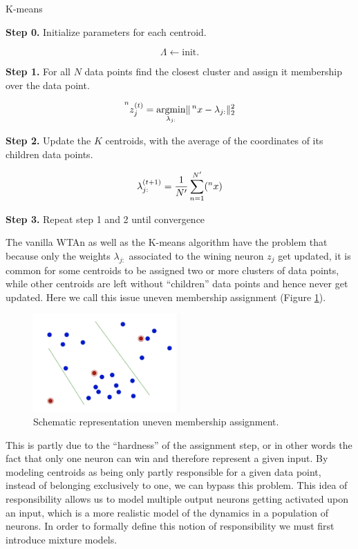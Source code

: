 \documentclass{article}
\begin{document}
\begin{algorithm}
\caption{K-means} \label{kmeans}
\begin{algorithmic}
\State \textbf{Step 0.} Initialize parameters for each centroid.
 
$$
\Lambda \leftarrow \text{init.}
$$
 
\State \textbf{Step 1.} For all $N$ data points find the closest cluster and assign it
membership over the data point.
 
$$
\prescript{n}{}{z^{(t)}_j} = \underset{\lambda_{j:}}{\operatorname{arg min}} \| \prescript{n}{}{x} - \lambda_{j:}\|_2^2
$$
 
\State \textbf{Step 2.} Update the $K$ centroids, with the average of the coordinates of its
children data points.
 
$$
\lambda_{j:}^{(t+1)} = \frac{1}{N'} \sum_{n=1}^{N'} (\prescript{n}{}{x})
$$
 
\State \textbf{Step 3.} Repeat step 1 and 2 until convergence
 
\end{algorithmic}
\end{algorithm}
 
The vanilla WTAn as well as the K-means algorithm have the problem
that because only the weights \(\lambda_{j:}\) associated to the wining
neuron \(z_j\) get updated, it is common for some centroids to be
assigned two or more clusters of data points, while other centroids are
left without ``children'' data points and hence never get updated. Here
we call this issue uneven membership assignment (Figure \ref{uma}).
 
\begin{figure}[h]
\centering
   \includegraphics[width=0.5\textwidth]{img/problems_kmeans.png}
   \caption{Schematic representation uneven membership assignment. \label{uma}}
\end{figure}
 
This is partly due to the ``hardness'' of the assignment step, or in other words the fact that
only one neuron can win and therefore represent a given input. By
modeling centroids as being only partly responsible for a given data
point, instead of belonging exclusively to one, we can bypass
this problem. This idea of responsibility allows us to model multiple output neurons getting
activated upon an input, which is a more realistic model of the dynamics in a population of neurons. In order to formally define this notion of responsibility we must first introduce mixture models.
 
\end{document}
